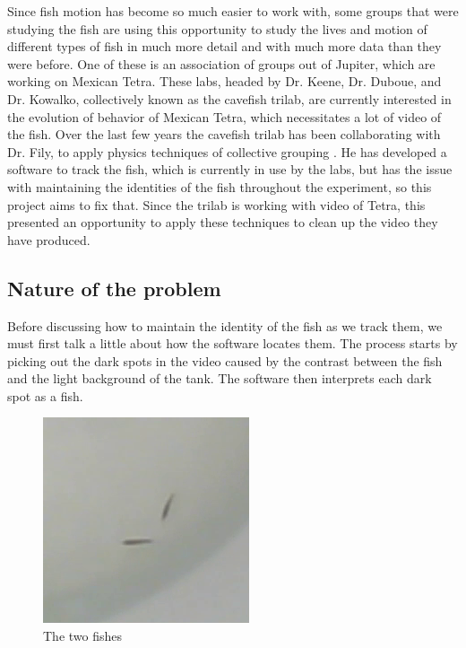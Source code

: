 \documentclass{article}
\begin{document}
Since fish motion has become so much easier to work with, some groups that were studying the fish are using this opportunity to study the lives and motion of different types of fish in much more detail and with much more data than they were before. One of these is an association of groups out of Jupiter, which are working on Mexican Tetra. These labs, headed by Dr. Keene, Dr. Duboue, and Dr. Kowalko, collectively known as the cavefish trilab, are currently interested in the evolution of behavior of Mexican Tetra, which necessitates a lot of video of the fish. Over the last few years the cavefish trilab has been collaborating with Dr. Fily, to apply physics techniques of collective grouping \cite{patch_kinematic_2020}. He has developed a software to track the fish, which is currently in use by the labs, but has the issue with maintaining the identities of the fish throughout the experiment, so this project aims to fix that. Since the trilab is working with video of Tetra, this presented an opportunity to apply these techniques to clean up the video they have produced. 

\subsection{Nature of the problem}

Before discussing how to maintain the identity of the fish as we track them, we must first talk a little about how the software locates them. The process starts by picking out the dark spots in the video caused by the contrast between the fish and the light background of the tank. The software then interprets each dark spot as a fish.

\begin{figure}[H]
	\centering
	\includegraphics[width=.5\linewidth]{140cropped}
	\caption{The two fishes}
	\label{fig:fish}
\end{figure}
\end{document}
